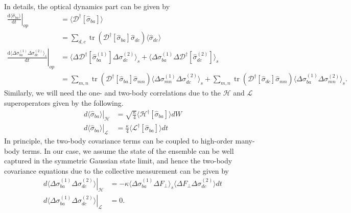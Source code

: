 \documentclass[pra,twocolumn,floatfix,superscriptaddress]{revtex4-1} %
\DeclareMathOperator{\tr}{tr}
\newcommand{\dt}[1]{\frac{{\mathrm d} {#1}}{{\mathrm d}t}}
\newcommand{\expect}[1]{\big\langle #1 \big\rangle}
\begin{document}
In details, the optical dynamics part can be given by
\begin{align}
\left. \dt{\expect{\hat{\sigma}_{ba}}}\right|_{op} &= \expect{\mathcal{D}^\dagger \left[ \hat{\sigma}_{ba}\right]}\\
&= \sum_{d,c}\tr\left(\mathcal{D}^\dagger \left[ \hat{\sigma}_{ba}\right]\hat{\sigma}_{dc} \right)\expect{\hat{\sigma}_{dc} }\\
\left. \dt{\expect{\Delta \sigma_{ba}^{(1)}\Delta \sigma_{dc}^{(2)}}_s}\right|_{op} &=\expect{\Delta\mathcal{D}^\dagger[\hat{\sigma}_{ba}^{(1)}]\Delta\sigma_{dc}^{(2)} }_s + \expect{\Delta\sigma_{ba}^{(1)}\Delta\mathcal{D}^\dagger[\hat{\sigma}_{dc}^{(2)}] }_s\\
&= \sum_{m,n}\tr\left(\mathcal{D}^\dagger[\hat{\sigma}_{ba}]\hat{\sigma}_{mn} \right)\expect{\Delta \sigma_{mn}^{(1)}\Delta \sigma_{dc}^{(2)} }_s + \sum_{m,n}\tr\left(\mathcal{D}^\dagger[\hat{\sigma}_{dc}]\hat{\sigma}_{mn} \right) \expect{\Delta \sigma_{ba}^{(1)}\Delta \sigma_{mn}^{(2)} }_s.
\end{align} 
Similarly, we will need the one- and two-body correlations due to the $ \mathcal{H} $ and $ \mathcal{L} $ superoperators given by the following.
\begin{subequations}
\begin{align}
\left.d\expect{\hat{\sigma}_{ba}}\right|_\mathcal{H} &=\sqrt{\frac{\kappa}{4}}\expect{\mathcal{H}^\dagger\left[\hat{\sigma}_{ba} \right]}dW \\
\left.d\expect{\hat{\sigma}_{ba}}\right|_\mathcal{L} &= \frac{\kappa}{4}\expect{\mathcal{L}^\dagger\left[\hat{\sigma}_{ba} \right]}dt
\end{align}
\end{subequations}
In principle, the two-body covariance terms can be coupled to high-order many-body terms. 
In our case, we assume the state of the ensemble can be well captured in the symmetric Gaussian state limit, and hence the two-body covariance equations due to the collective measurement can be given by
\begin{subequations}
\begin{align}
\left.d\expect{\Delta \sigma_{ba}^{(1)} \Delta \sigma_{dc}^{(2)}} \right|_\mathcal{H} &= -\kappa\expect{\Delta\sigma_{ba}^{(1)}\Delta F_\perp }_s \expect{\Delta F_\perp \Delta \sigma_{dc}^{(2)} }dt \\
\left.d\expect{\Delta \sigma_{ba}^{(1)} \Delta \sigma_{dc}^{(2)}}\right|_\mathcal{L} &= 0.
\end{align}
\end{subequations}
\end{document}
